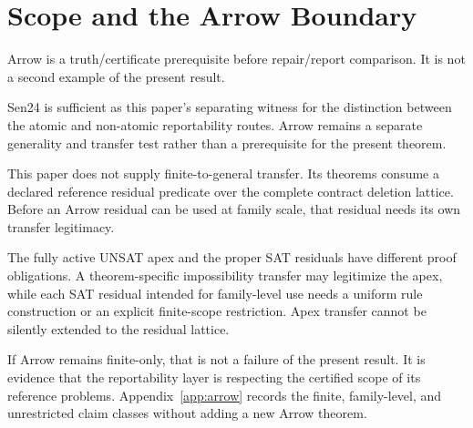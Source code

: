 \section{Scope and the Arrow Boundary}
\label{sec:arrow-scope}

Arrow is a truth/certificate prerequisite before repair/report comparison.
It is not a second example of the present result.

Sen24 is sufficient as this paper's separating witness for the distinction
between the atomic and non-atomic reportability routes.  Arrow remains a
separate generality and transfer test rather than a prerequisite for the
present theorem.

This paper does not supply finite-to-general transfer.  Its theorems consume a declared
reference residual predicate over the complete contract deletion lattice.
Before an Arrow residual can be used at family scale, that residual needs its
own transfer legitimacy.

The fully active UNSAT apex and the proper SAT residuals have different proof
obligations.  A theorem-specific impossibility transfer may legitimize the
apex, while each SAT residual intended for family-level use needs a uniform rule
construction or an explicit finite-scope restriction.  Apex transfer cannot be
silently extended to the residual lattice.

If Arrow remains finite-only, that is not a failure of the present result.  It is evidence that
the reportability layer is respecting the certified scope of its reference
problems.  Appendix~\ref{app:arrow} records the finite, family-level, and
unrestricted claim classes without adding a new Arrow theorem.
